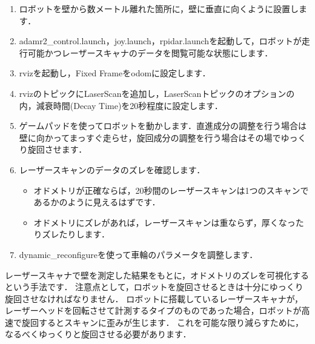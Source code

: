 \documentclass[{../../master}]{subfiles}
\begin{document}
\begin{enumerate}
  \item ロボットを壁から数メートル離れた箇所に，壁に垂直に向くように設置します．
  \item \textsf{adamr2\_control.launch}，\textsf{joy.launch}，\textsf{rpidar.launch}を起動して，ロボットが走行可能かつレーザースキャナのデータを閲覧可能な状態にします．
  \item \textsf{rviz}を起動し，\textsf{Fixed Frame}を\textsf{odom}に設定します．
  \item \textsf{rviz}のトピックに\textsf{LaserScan}を追加し，\textsf{LaserScan}トピックのオプションの内，減衰時間(Decay Time)を20秒程度に設定します．
  \item ゲームパッドを使ってロボットを動かします．直進成分の調整を行う場合は壁に向かってまっすぐ走らせ，旋回成分の調整を行う場合はその場でゆっくり旋回させます．
  \item レーザースキャンのデータのズレを確認します．
    \begin{itemize}
      \item オドメトリが正確ならば，20秒間のレーザースキャンは1つのスキャンであるかのように見えるはずです．
      \item オドメトリにズレがあれば，レーザースキャンは重ならず，厚くなったりズレたりします．
    \end{itemize}
  \item \textsf{dynamic\_reconfigure}を使って車輪のパラメータを調整します．
\end{enumerate}

レーザースキャナで壁を測定した結果をもとに，オドメトリのズレを可視化するという手法です．
注意点として，ロボットを旋回させるときは十分にゆっくり旋回させなければなりません．
ロボットに搭載しているレーザースキャナが，レーザーヘッドを回転させて計測するタイプのものであった場合，ロボットが高速で旋回するとスキャンに歪みが生じます．
これを可能な限り減らすために，なるべくゆっくりと旋回させる必要があります．
\end{document}
